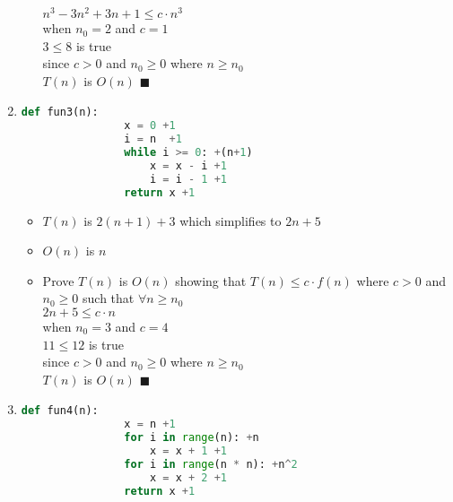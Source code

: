 \documentclass[11pt]{article}
\begin{document}
\begin{enumerate}[label=(\arabic*)]
\begin{itemize}
\centering $n^3-3n^2+3n+1\leq c \cdot n^3$  \\
\vspace{5pt}
when $n_{0} = 2$ and $c = 1$ \\
\vspace{5pt}
\centering $ 3 \leq 8$ is true\\
\vspace{5pt} 
since $c > 0$ and $ n_{0} \geq 0 $  where  $   n \geq n_{0}$ \\
\vspace{5pt}
 $T(n)$ is $O(n)$  $\blacksquare$ 
							
\end{itemize}

\noindent\makebox[\linewidth]{\rule{\paperwidth}{0.4pt}}

      \item \begin{lstlisting}[language=Python]
            def fun3(n):
                x = 0 +1
                i = n  +1
                while i >= 0: +(n+1) 
                    x = x - i +1
                    i = i - 1 +1
                return x +1
            \end{lstlisting}

\begin{itemize}
\item $T(n)$ is $2(n+1)+3$ which simplifies to $2n+5$
\item $O(n)$ is $n$

\item Prove $T(n)$ is $O(n)$ showing that $T(n) \leq c \cdot f(n)$ where $c > 0$ and $n_{0} \geq 0$ such that $ \forall  n \geq n_{0}$ \\ 

\centering $2n+5\leq c \cdot n$  \\
\vspace{5pt}
when $n_{0} = 3$ and $c = 4$ \\
\vspace{5pt}
\centering $ 11 \leq 12$ is true\\
\vspace{5pt} 
since $c > 0$ and $ n_{0} \geq 0 $ where $n \geq n_{0}$\\
\vspace{5pt}
 $T(n)$ is $O(n)$  $\blacksquare$

							
\end{itemize}

\noindent\makebox[\linewidth]{\rule{\paperwidth}{0.4pt}}

      \item \begin{lstlisting}[language=Python]
            def fun4(n):
                x = n +1
                for i in range(n): +n
                    x = x + 1 +1
                for i in range(n * n): +n^2
                    x = x + 2 +1
                return x +1
            \end{lstlisting}


\end{enumerate}
\end{document}
